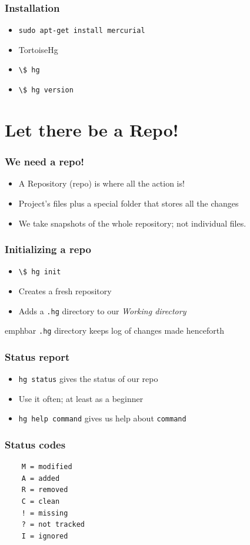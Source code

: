\documentclass[14pt,compress]{beamer}
\newcommand{\emphbar}[1]
{\begin{beamercolorbox}[rounded=true]{emphbar} 
      {#1}
 \end{beamercolorbox}
}
\newcommand{\typ}[1]{\lstinline{#1}}
\begin{document}
\begin{frame}
  \frametitle{Installation}
  \begin{itemize}
  \item \typ{sudo apt-get install mercurial}
  \item TortoiseHg
  \item \typ{\$ hg}
  \item \typ{\$ hg version}
  \end{itemize}
\end{frame}

\section{Let there be a Repo!}
\begin{frame}
  \frametitle{We need a repo!}
  \begin{itemize}
  \item A Repository (repo) is where all the action is!
  \item Project's files plus a special folder that stores all the
    changes
  \item We take snapshots of the whole repository; not individual
    files. 
  \end{itemize}
\end{frame}

\begin{frame}
  \frametitle{Initializing a repo}
  \begin{itemize}
  \item \typ{\$ hg init}
  \item Creates a fresh repository
  \item Adds a \typ{.hg} directory to our \emph{Working directory}
  \end{itemize}
  \emphbar{\typ{.hg} directory keeps log of changes made henceforth}
\end{frame}

\begin{frame}
  \frametitle{Status report}
  \begin{itemize}
  \item \typ{hg status} gives the status of our repo
  \item Use it often; at least as a beginner
  \item \typ{hg help command} gives us help about \typ{command}
  \end{itemize}
\end{frame}

\begin{frame}[fragile]
  \frametitle{Status codes}
  \begin{lstlisting}
    M = modified                                               
    A = added                                                  
    R = removed                                                
    C = clean                                                  
    ! = missing 
    ? = not tracked                                            
    I = ignored                                                
  \end{lstlisting}
\end{frame}
\end{document}
